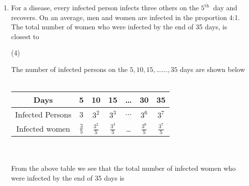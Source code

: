 \begin{enumerate}
 \begin{tasks}(4)
\end{tasks}
\begin{answer}
	\begin{align*}
	\intertext{In order to buy maximum number of diamonds, we must start with diamond size with cheapest rate then next cheapest and so on.}
	&\text{All 20 diamonds with carat size $0.25$ can be purchased.}\\
	&\text{This is because $20 \times 0.25 \times 2=5$ lakh}\\
   &\text{	Only 5 diamonds of $0.5$ carat size can be purchased}\\
&\text{	This is because}\\
	&5 \times 0.5 \times 2=5 \text { lakh }\\
	&\text{Now all money has been exhausted and no further diamonds can be purchased.}\\
	&\text{Hence required answer $=20+5=25$}
	\end{align*}
			So the correct answer is \textbf{Option (b)}
\end{answer}
\item For a disease, every infected person infects three others on the $5^{\text {th }}$ day and recovers. On an average, men and women are infected in the proportion 4:1. The total number of women who were infected by the end of 35 days, is closest to
 \begin{tasks}(4)
\end{tasks}
\begin{answer}
	The number of infected persons on the $5,10,15, \ldots \ldots, 35$ days are shown below\\\\
	\renewcommand*{\arraystretch}{1.5}
	\begin{tabular}{|c|c|c|c|c|c|c|}
		\hline Days & 5 & 10 & 15 &\dots &30&35\\
		\hline Infected Persons& 3 & $3^{2}$ & $3^{3}$ &$\dots$& $3^{6}$& $3^{7}$\\
		\hline Infected  women  & $\frac{3}{5}$ & $\frac{3^{2}}{5}$ & $\frac{3^{3}}{5}$&\dots &$\frac{3^{6}}{5}$&$\frac{3^{7}}{5}$\\\hline
	\end{tabular}\\\\
From the above table we see that the total number of infected women who were infected by the end of 35 days is

\end{answer}
\end{enumerate}
